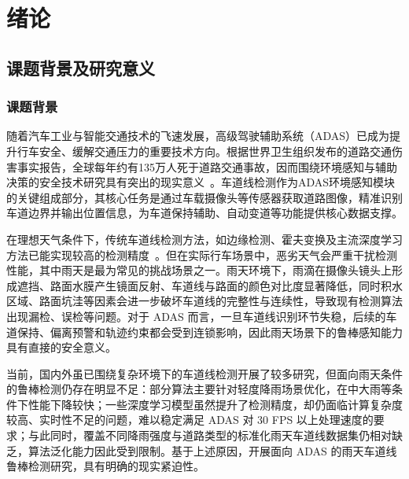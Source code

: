 
\chapter{绪论}
\label{cha:introduction}
\section{课题背景及研究意义}
\label{sec:background}
\subsection{课题背景}
随着汽车工业与智能交通技术的飞速发展，高级驾驶辅助系统（ADAS）已成为提升行车安全、缓解交通压力的重要技术方向。根据世界卫生组织发布的道路交通伤害事实报告，全球每年约有135万人死于道路交通事故，因而围绕环境感知与辅助决策的安全技术研究具有突出的现实意义~\cite{who2023}。车道线检测作为ADAS环境感知模块的关键组成部分，其核心任务是通过车载摄像头等传感器获取道路图像，精准识别车道边界并输出位置信息，为车道保持辅助、自动变道等功能提供核心数据支撑。

在理想天气条件下，传统车道线检测方法，如边缘检测、霍夫变换及主流深度学习方法已能实现较高的检测精度~\cite{neven2018}。但在实际行车场景中，恶劣天气会严重干扰检测性能，其中雨天是最为常见的挑战场景之一。雨天环境下，雨滴在摄像头镜头上形成遮挡、路面水膜产生镜面反射、车道线与路面的颜色对比度显著降低，同时积水区域、路面坑洼等因素会进一步破坏车道线的完整性与连续性，导致现有检测算法出现漏检、误检等问题。对于 ADAS 而言，一旦车道线识别环节失稳，后续的车道保持、偏离预警和轨迹约束都会受到连锁影响，因此雨天场景下的鲁棒感知能力具有直接的安全意义。

当前，国内外虽已围绕复杂环境下的车道线检测开展了较多研究，但面向雨天条件的鲁棒检测仍存在明显不足：部分算法主要针对轻度降雨场景优化，在中大雨等条件下性能下降较快；一些深度学习模型虽然提升了检测精度，却仍面临计算复杂度较高、实时性不足的问题，难以稳定满足 ADAS 对 30 FPS 以上处理速度的要求；与此同时，覆盖不同降雨强度与道路类型的标准化雨天车道线数据集仍相对缺乏，算法泛化能力因此受到限制。基于上述原因，开展面向 ADAS 的雨天车道线鲁棒检测研究，具有明确的现实紧迫性。

